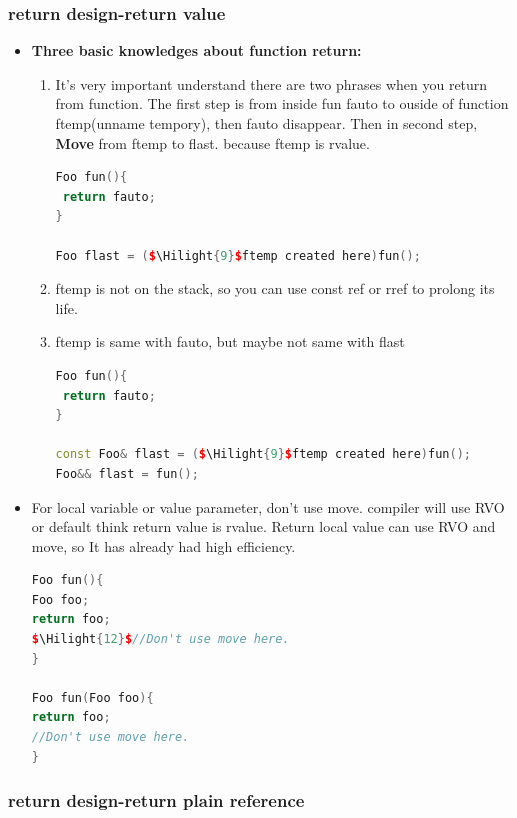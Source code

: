 \documentclass[a4paper,12pt,twoside]{book}
\newcommand{\Hilight}[1]{\makebox[0pt][l]{\color{yellow}\rule[-3pt]{#1em}{11pt}}}
\begin{document}
\subsubsection{return design-return value}
\begin{itemize}
		\item \textbf{Three basic knowledges about function return:}
				\begin{enumerate}
\item It's very important understand there are two phrases when you return from function. The first step  is from inside fun fauto to ouside of function ftemp(unname tempory), then fauto disappear.  Then in second step, \textbf{Move} from ftemp to flast. because ftemp is rvalue.
\begin{lstlisting}[frame=single, language=c++]
Foo fun(){
 return fauto;
}

Foo flast = ($\Hilight{9}$ftemp created here)fun();
\end{lstlisting}
\item ftemp is not on the stack, so you can use const ref or rref to prolong its life. 
\item ftemp is same with fauto, but maybe not same with flast
\begin{lstlisting}[frame=single, language=c++]
Foo fun(){
 return fauto;
}

const Foo& flast = ($\Hilight{9}$ftemp created here)fun();
Foo&& flast = fun();
\end{lstlisting}
\end{enumerate}

\item For local variable or value parameter, don't use move. compiler will use RVO or default think return value is rvalue.  Return local value can use RVO and move, so It has already had high efficiency.

\begin{lstlisting}[frame=single, language=c++]
Foo fun(){
Foo foo;
return foo;
$\Hilight{12}$//Don't use move here.
}

Foo fun(Foo foo){
return foo;
//Don't use move here.
}
\end{lstlisting}
\end{itemize}
\subsubsection{return design-return plain reference} 
\end{document}
